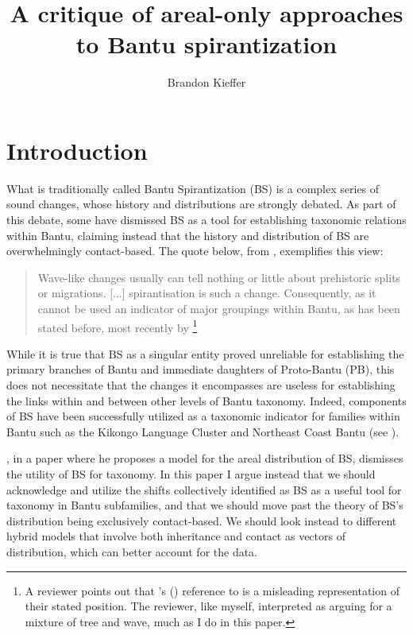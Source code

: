 \documentclass[output=paper,colorlinks,citecolor=brown
]{langscibook}
\author{Brandon Kieffer}\affiliation{University of Edinburgh}
\title{A critique of areal-only approaches to Bantu spirantization}
\begin{document}
\maketitle
\section{Introduction}

What is traditionally called Bantu Spirantization (BS) is a complex series of sound changes, whose history and distributions are strongly debated. As part of this debate, some have dismissed BS as a tool for establishing taxonomic relations within Bantu, claiming instead that the history and distribution of BS are overwhelmingly contact-based. The quote below, from \citet[99]{Janson2007}, exemplifies this view:
\begin{quote}
    Wave-like changes usually can tell nothing or little about prehistoric splits or migrations. [...] spirantisation is such a change. Consequently, as it cannot be used an indicator of major groupings within Bantu, as has been stated before, most recently by \citet[174]{NursePhillipson2003}\footnote{A reviewer points out that \citeauthor{Janson2007}'s (\citeyear{Janson2007}) reference to \citet{NursePhillipson2003} is a misleading representation of their stated position. The reviewer, like myself, interpreted \citet{NursePhillipson2003} as arguing for a mixture of tree and wave, much as I do in this paper.}
\end{quote}

While it is true that BS as a singular entity proved unreliable for establishing the primary branches of Bantu and immediate daughters of Proto-Bantu (PB), this does not necessitate that the changes it encompasses are useless for establishing the links within and between other levels of Bantu taxonomy. Indeed, components of  BS have been successfully utilized as a taxonomic indicator for families within Bantu such as the Kikongo Language Cluster \citep{bostoen2019} and Northeast Coast Bantu \citep{hinnebusch1981} (see ).

\citeauthor{Janson2007}, in a \citeyear{Janson2007} paper where he proposes a model for the areal distribution of BS, dismisses the utility of BS for taxonomy. In this paper I argue instead that we should acknowledge and utilize the shifts collectively identified as BS as a useful tool for taxonomy in Bantu subfamilies, and that we should move past the theory of BS’s distribution being exclusively contact-based. We should look instead to different hybrid models that involve both inheritance and contact as vectors of distribution, which can better account for the data.
\end{document}
